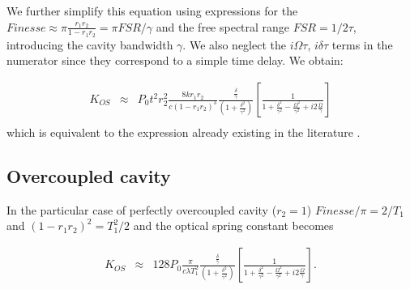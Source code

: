 We further simplify this equation using expressions for the $Finesse \approx \pi \frac{r_1r_2}{1-r_1r_2}= \pi FSR/\gamma$ and the free spectral range $FSR=1/2\tau$, introducing  the cavity bandwidth $\gamma$. We also neglect the $i\Omega\tau$, $i\delta\tau$ terms in the numerator since they correspond to a simple time delay. We obtain:

\begin{align}
K_{OS} & \approx & P_0 t^2 r_2^2 \frac{8k r_1r_2}{c(1-r_1r_2)^3}\frac{ \frac{\delta}{\gamma}}{(1+\frac{\delta^2}{\gamma^2})} 
\left[\frac{1}{1+\frac{\delta^2}{\gamma^2}-\frac{\Omega^2}{\gamma^2}+i2\frac{\Omega}{\gamma} }\right]\nonumber\\
\end{align}
which is equivalent to the expression already existing in the literature \cite{Barginsky02,Corbitt07}.

\subsection{Overcoupled cavity}

In the particular case of perfectly overcoupled cavity ($r_2=1$) $Finesse/\pi=2/T_1$ and $(1-r_1r_2)^2=T_1^2/2$ and the optical spring constant becomes

\begin{align}
K_{OS} & \approx & 128 P_0  \frac{\pi}{c\lambda T_1^2}\frac{ \frac{\delta}{\gamma}}{(1+\frac{\delta^2}{\gamma^2})} 
\left[\frac{1}{1+\frac{\delta^2}{\gamma^2}-\frac{\Omega^2}{\gamma^2}+i2\frac{\Omega}{\gamma} }\right].\nonumber\\
\label{eqn:overcoupled}
\end{align}

